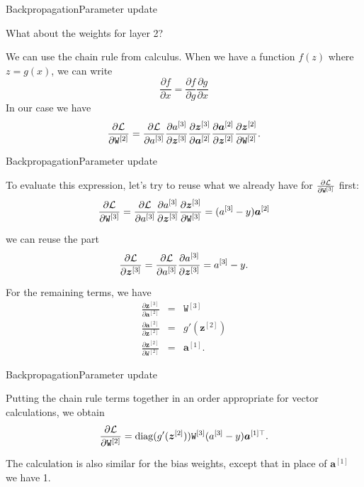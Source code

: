 \documentclass{beamer}
\renewcommand{\vec}[1]{\boldsymbol{#1}}
\newcommand{\mat}[1]{\mathtt{#1}}
\DeclareMathOperator*{\diag}{diag}
\begin{document}
\begin{frame}{Backpropagation}{Parameter update}

  What about the weights for layer 2?

  \medskip

  We can use the chain rule from calculus. When we have a function $f(z)$
  where $z = g(x)$, we can write
  \[ \frac{\partial f}{\partial x} =
  \frac{\partial f}{\partial g}\frac{\partial g}{\partial x} \]
  In our case we have
  \[ \frac{\partial {\cal L}}{\partial \mat{W}^{[2]}} =
  \frac{\partial \cal L}{\partial a^{[3]}}
  \frac{\partial a^{[3]}}{\partial \vec{z}^{[3]}}
  \frac{\partial \vec{z}^{[3]}}{\partial \vec{a}^{[2]}}
  \frac{\partial \vec{a}^{[2]}}{\partial \vec{z}^{[2]}}
  \frac{\partial \vec{z}^{[2]}}{\partial \mat{W}^{[2]}} . \]
  
\end{frame}


\begin{frame}{Backpropagation}{Parameter update}

  To evaluate this expression, let's try to reuse what we already
  have for $\frac{\partial \cal L}{\partial \mat{W}^{[3]}}$ first:
  \[ \frac{\partial \cal L}{\partial \mat{W}^{[3]}} =
  \frac{\partial \cal L}{\partial a^{[3]}}
  \frac{\partial a^{[3]}}{\partial \vec{z}^{[3]}}
  \frac{\partial \vec{z}^{[3]}}{\partial \mat{W}^{[3]}} =
  (a^{[3]}-y)\vec{a}^{[2]} \]
  
  we can reuse the part
  \[ \frac{\partial \cal L}{\partial \vec{z}^{[3]}} = \frac{\partial \cal L}{\partial a^{[3]}}
  \frac{\partial a^{[3]}}{\partial \vec{z}^{[3]}} = 
  a^{[3]}-y. \]

  For the remaining terms, we have
  \begin{eqnarray*}
    \frac{\partial \vec{z}^{[3]}}{\partial \vec{a}^{[2]}} & = & \mat{W}^{[3]}\\
    \frac{\partial \vec{a}^{[2]}}{\partial \vec{z}^{[2]}} & = & g'(\vec{z}^{[2]})\\
    \frac{\partial \vec{z}^{[2]}}{\partial \mat{W}^{[2]}} & = & \vec{a}^{[1]}.
  \end{eqnarray*}
    
\end{frame}


\begin{frame}{Backpropagation}{Parameter update}

  Putting the chain rule terms together in an order appropriate for
  vector calculations, we obtain
  \[ \frac{\partial \cal L}{\partial \mat{W}^{[2]}} =
  \diag(g'(\vec{z}^{[2]}))
  \mat{W}^{[3]}
  (a^{[3]}-y)\vec{a}^{[1]\top}. \]

  \medskip
  
  The calculation is also similar for the bias weights, except that
  in place of $\vec{a}^{[1]}$ we have 1.

\end{frame}
\end{document}
